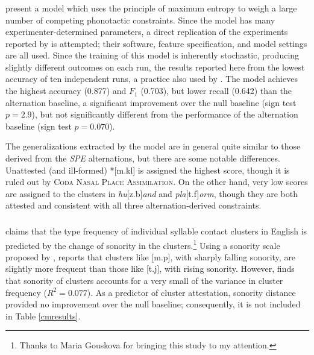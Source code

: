 \subsubsection{\citealt{Hayes2008a}}

\citet{Hayes2008a} present a model which uses the principle of maximum entropy to weigh a large number of competing phonotactic constraints. Since the model has many experimenter-determined parameters, a direct replication of the experiments reported by \citeauthor{Hayes2008a} is attempted; their software, feature specification, and model settings are all used. Since the training of this model is inherently stochastic, producing slightly different outcomes on each run, the results reported here from the lowest accuracy of ten independent runs, a practice also used by \citeauthor{Hayes2008a}. The model achieves the highest accuracy (0.877) and $F_1$ (0.703), but lower recall (0.642) than the alternation baseline, a significant improvement over the null baseline (sign test $p = 2.9$), but not significantly different from the performance of the alternation baseline (sign test $p = 0.070$). 

The generalizations extracted by the \citeauthor{Hayes2008a} model are in general quite similar to those derived from the \emph{SPE} alternations, but there are some notable differences. Unattested (and ill-formed) *[m.kl] is assigned the highest score, though it is ruled out by \textsc{Coda Nasal Place Assimilation}. On the other hand, very low scores are assigned to the clusters in \emph{hu}[z.b]\emph{and} and \emph{pla}[t.f]\emph{orm}, though they are both attested and consistent with all three alternation-derived constraints. 

\subsubsection{\citealt{McGowan2009}}

\citet{McGowan2009} claims that the type frequency of individual syllable contact clusters in English is predicted by the change of sonority in the clusters.\footnote{Thanks to Maria Gouskova for bringing this study to my attention.} Using a sonority scale proposed by \citet{Jespersen1904}, \citeauthor{McGowan2009} reports that clusters like [m.p], with sharply falling sonority, are slightly more frequent than those like [t.j], with rising sonority. However, \citeauthor{McGowan2009} finds that sonority of clusters accounts for a very small of the variance in cluster frequency ($R^2 = 0.077$). As a predictor of cluster attestation, sonority distance provided no improvement over the null baseline; consequently, it is not included in Table \ref{cmresults}.

